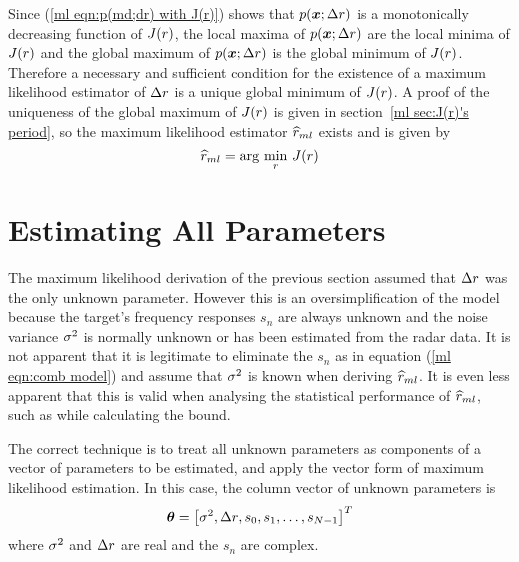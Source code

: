 Since (\ref{ml eqn:p(md;dr) with J(r)}) shows that 
$p(\bm{x};{\Delta r})$ is a monotonically decreasing function of $J({r})$,
the local maxima of $p(\bm{x};{\Delta r})$ are the local minima of $J({r})$ and
the global maximum of $p(\bm{x};{\Delta r})$ is the global minimum of $J({r})$.
Therefore a necessary and sufficient condition for the existence of a
maximum likelihood estimator of ${\Delta r}$ is a unique global minimum of $J({r})$.  
A proof of the uniqueness of the global maximum of $J({r})$ is given in 
section~\ref{ml sec:J(r)'s period}, so the maximum likelihood estimator $\widehat{r}_{ml}$
exists and is given by
\begin{equation}\label{ml eqn:rML}
\widehat{r}_{ml}=\arg\,\min_{{r}}\,J({r})
\end{equation}

\section{Estimating All Parameters}

The maximum likelihood derivation of the previous section assumed that ${\Delta r}$
was the only unknown parameter.  However this is an oversimplification of
the model because the target's frequency responses $s_n$ are always unknown
and the noise variance ${\sigma^2}$ is normally unknown or has been estimated from
the radar data.  It is not apparent that it is legitimate to eliminate the
$s_n$ as in equation (\ref{ml eqn:comb model}) and assume that ${\sigma^2}$ is
known when deriving $\widehat{r}_{ml}$.  It is even less apparent that this is valid 
when analysing the statistical performance of $\widehat{r}_{ml}$, such as while 
calculating the \CR bound.  

The correct technique is to treat all unknown parameters as components of a
vector of parameters to be estimated, and apply the vector form of maximum
likelihood estimation.  In this case, the column vector of unknown
parameters is
\begin{equation}\label{ml eqn:uvp}
\bm{\theta}=\left[{\sigma^2}, {\Delta r}, s_0, s_1, \ldots, s_{N-1}\right]^T
\end{equation}
where ${\sigma^2}$ and ${\Delta r}$ are real and the $s_n$ are complex.  

